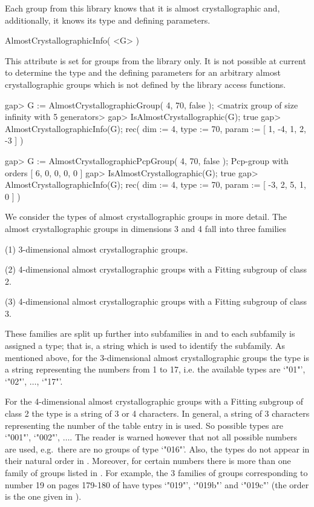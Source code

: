 
Each group from this library knows that it is almost crystallographic and,
additionally, it knows its type and defining parameters.

\> AlmostCrystallographicInfo( <G> ) 

This attribute is set for groups from the library only. It is not possible
at current to determine the type and the defining parameters for an arbitrary 
almost crystallographic groups which is not defined by the library access 
functions. 

\beginexample
gap> G := AlmostCrystallographicGroup( 4, 70, false );   
<matrix group of size infinity with 5 generators>
gap> IsAlmostCrystallographic(G);
true
gap> AlmostCrystallographicInfo(G);
rec( dim := 4, type := 70, param := [ 1, -4, 1, 2, -3 ] )
\endexample

\beginexample
gap> G := AlmostCrystallographicPcpGroup( 4, 70, false );
Pcp-group with orders [ 6, 0, 0, 0, 0 ]
gap> IsAlmostCrystallographic(G);
true
gap> AlmostCrystallographicInfo(G);
rec( dim := 4, type := 70, param := [ -3, 2, 5, 1, 0 ] )
\endexample

We consider the types of almost crystallographic groups in more detail. The 
almost crystallographic groups in dimensions 3 and 4 fall into three families

\beginlist
\item{(1)} 3-dimensional almost crystallographic groups.
\item{(2)} 4-dimensional almost crystallographic groups with a
           Fitting subgroup of class 2.
\item{(3)} 4-dimensional almost crystallographic groups with a
           Fitting subgroup of class 3.
\endlist

These families are split up further into subfamilies in \cite{KD} and to 
each subfamily is assigned a type; that is, a string which is used to 
identify the subfamily. As mentioned above, for the 3-dimensional almost 
crystallographic groups the type is a string representing the numbers from 
1 to 17, i.e. the available types are `"01"', `"02"', $\ldots$, `"17"'. 

For the 4-dimensional almost crystallographic groups with a Fitting subgroup 
of class 2 the type is a string of 3 or 4 characters. In general, a string of 
3 characters representing
the number of the table entry in \cite{KD} is used. So possible types are 
`"001"', `"002"', $\ldots$. The reader is warned however that not all 
possible numbers are used, e.g.\ there are no groups of type `"016"'. Also, 
the types do not appear in their natural order in \cite{KD}. Moreover, for 
certain numbers there is more than one family of groups listed in \cite{KD}. 
For example, the 3 families of groups corresponding to number 19 on pages 
179-180 of \cite{KD} have types `"019"', `"019b"' and `"019c"' (the order is 
the one given in \cite{KD}).

